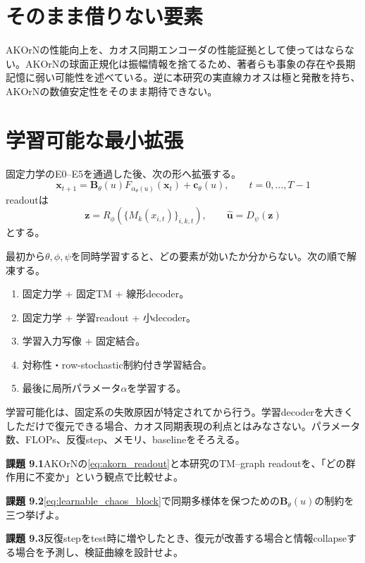\documentclass[a4paper,11pt,oneside,openany]{ltjsbook}
\newcommand{\vect}[1]{\bm{#1}}
\newcommand{\mat}[1]{\bm{#1}}
\begin{document}
\section{そのまま借りない要素}

\begin{cautionbox}
AKOrNの性能向上を、カオス同期エンコーダの性能証拠として使ってはならない。AKOrNの球面正規化は振幅情報を捨てるため、著者らも事象の存在や長期記憶に弱い可能性を述べている。逆に本研究の実直線カオスは極と発散を持ち、AKOrNの数値安定性をそのまま期待できない。
\end{cautionbox}

\section{学習可能な最小拡張}

固定力学のE0--E5を通過した後、次の形へ拡張する。
\begin{equation}
  \vect x_{t+1}
  =\mat B_{\theta}(u)
    F_{\alpha_\theta(u)}(\vect x_t)
   +\vect c_{\theta}(u),
  \qquad t=0,\dots,T-1
  \label{eq:learnable_chaos_block}
\end{equation}
readoutは
\begin{equation}
  \vect z
  =R_{\phi}\left(
    \{M_k(x_{i,t})\}_{i,k,t}
  \right),
  \qquad
  \widehat{\vect u}=D_\psi(\vect z)
  \label{eq:learnable_tm_encoder}
\end{equation}
とする。

最初から\(\theta,\phi,\psi\)を同時学習すると、どの要素が効いたか分からない。次の順で解凍する。

\begin{enumerate}
  \item 固定力学 + 固定TM + 線形decoder。
  \item 固定力学 + 学習readout + 小decoder。
  \item 学習入力写像 + 固定結合。
  \item 対称性・row-stochastic制約付き学習結合。
  \item 最後に局所パラメータ\(\alpha\)を学習する。
\end{enumerate}

\begin{gatebox}
学習可能化は、固定系の失敗原因が特定されてから行う。学習decoderを大きくしただけで復元できる場合、カオス同期表現の利点とはみなさない。パラメータ数、FLOPs、反復step、メモリ、baselineをそろえる。
\end{gatebox}

\begin{taskbox}
\textbf{課題 9.1}\quad AKOrNの\cref{eq:akorn_readout}と本研究のTM--graph readoutを、「どの群作用に不変か」という観点で比較せよ。

\medskip
\textbf{課題 9.2}\quad \cref{eq:learnable_chaos_block}で同期多様体を保つための\(\mat B_\theta(u)\)の制約を三つ挙げよ。

\medskip
\textbf{課題 9.3}\quad 反復stepをtest時に増やしたとき、復元が改善する場合と情報collapseする場合を予測し、検証曲線を設計せよ。
\end{taskbox}
\end{document}
